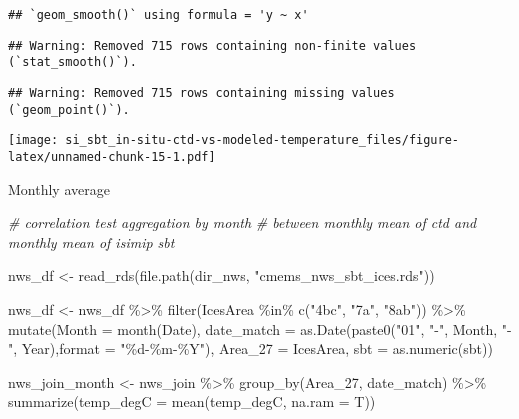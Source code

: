 \documentclass[
]{article}
\newenvironment{Shaded}{\begin{snugshade}}{\end{snugshade}}
\newcommand{\AttributeTok}[1]{\textcolor[rgb]{0.77,0.63,0.00}{#1}}
\newcommand{\CommentTok}[1]{\textcolor[rgb]{0.56,0.35,0.01}{\textit{#1}}}
\newcommand{\FunctionTok}[1]{\textcolor[rgb]{0.00,0.00,0.00}{#1}}
\newcommand{\NormalTok}[1]{#1}
\newcommand{\OtherTok}[1]{\textcolor[rgb]{0.56,0.35,0.01}{#1}}
\newcommand{\SpecialCharTok}[1]{\textcolor[rgb]{0.00,0.00,0.00}{#1}}
\newcommand{\StringTok}[1]{\textcolor[rgb]{0.31,0.60,0.02}{#1}}
\begin{document}
\begin{verbatim}
## `geom_smooth()` using formula = 'y ~ x'
\end{verbatim}

\begin{verbatim}
## Warning: Removed 715 rows containing non-finite values (`stat_smooth()`).
\end{verbatim}

\begin{verbatim}
## Warning: Removed 715 rows containing missing values (`geom_point()`).
\end{verbatim}

\texttt{[image: si\_sbt\_in-situ-ctd-vs-modeled-temperature\_files/figure-latex/unnamed-chunk-15-1.pdf]}

Monthly average

\begin{Shaded}
\begin{Highlighting}[]
\CommentTok{\# correlation test aggregation by month}
\CommentTok{\# between monthly mean of ctd and monthly mean of isimip sbt}

\NormalTok{nws\_df }\OtherTok{\textless{}{-}} \FunctionTok{read\_rds}\NormalTok{(}\FunctionTok{file.path}\NormalTok{(dir\_nws, }\StringTok{"cmems\_nws\_sbt\_ices.rds"}\NormalTok{))}

\NormalTok{nws\_df }\OtherTok{\textless{}{-}}\NormalTok{ nws\_df }\SpecialCharTok{\%\textgreater{}\%}
  \FunctionTok{filter}\NormalTok{(IcesArea }\SpecialCharTok{\%in\%} \FunctionTok{c}\NormalTok{(}\StringTok{"4bc"}\NormalTok{, }\StringTok{"7a"}\NormalTok{, }\StringTok{"8ab"}\NormalTok{)) }\SpecialCharTok{\%\textgreater{}\%}
  \FunctionTok{mutate}\NormalTok{(}\AttributeTok{Month =} \FunctionTok{month}\NormalTok{(Date),}
         \AttributeTok{date\_match =} \FunctionTok{as.Date}\NormalTok{(}\FunctionTok{paste0}\NormalTok{(}\StringTok{"01"}\NormalTok{, }\StringTok{"{-}"}\NormalTok{, Month, }\StringTok{"{-}"}\NormalTok{, Year),}\AttributeTok{format =} \StringTok{"\%d{-}\%m{-}\%Y"}\NormalTok{), }
         \AttributeTok{Area\_27 =}\NormalTok{ IcesArea,}
         \AttributeTok{sbt =} \FunctionTok{as.numeric}\NormalTok{(sbt)) }

\NormalTok{nws\_join\_month }\OtherTok{\textless{}{-}}\NormalTok{ nws\_join }\SpecialCharTok{\%\textgreater{}\%} 
  \FunctionTok{group\_by}\NormalTok{(Area\_27, date\_match) }\SpecialCharTok{\%\textgreater{}\%} 
  \FunctionTok{summarize}\NormalTok{(}\AttributeTok{temp\_degC =} \FunctionTok{mean}\NormalTok{(temp\_degC, }\AttributeTok{na.ram =}\NormalTok{ T))}
\end{Highlighting}
\end{Shaded}
\end{document}
